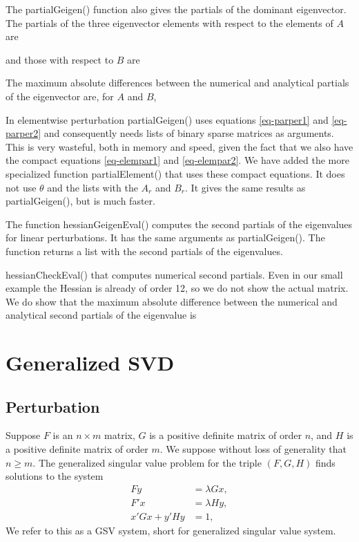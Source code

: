 \documentclass[
  12pt,
  letterpaper,
  DIV=11,
  numbers=noendperiod]{scrartcl}
\newcommand{\sectionbreak}{\clearpage}
\begin{document}
The partialGeigen() function also gives the partials of the dominant
eigenvector. The partials of the three eigenvector elements with respect
to the elements of \(A\) are

and those with respect to \(B\) are

The maximum absolute differences between the numerical and analytical
partials of the eigenvector are, for \(A\) and \(B\),

In elementwise perturbation partialGeigen() uses equations
\eqref{eq-parper1} and \eqref{eq-parper2} and consequently needs lists
of binary sparse matrices as arguments. This is very wasteful, both in
memory and speed, given the fact that we also have the compact equations
\eqref{eq-elempar1} and \eqref{eq-elempar2}. We have added the more
specialized function partialElement() that uses these compact equations.
It does not use \(\theta\) and the lists with the \(A_r\) and \(B_r\).
It gives the same results as partialGeigen(), but is much faster.

The function hessianGeigenEval() computes the second partials of the
eigenvalues for linear perturbations. It has the same arguments as
partialGeigen(). The function returns a list with the second partials of
the eigenvalues.

hessianCheckEval() that computes numerical second partials. Even in our
small example the Hessian is already of order 12, so we do not show the
actual matrix. We do show that the maximum absolute difference between
the numerical and analytical second partials of the eigenvalue is

\sectionbreak

\section{Generalized SVD}\label{sec-GSV}

\subsection{Perturbation}\label{perturbation}

Suppose \(F\) is an \(n\times m\) matrix, \(G\) is a positive definite
matrix of order \(n\), and \(H\) is a positive definite matrix of order
\(m\). We suppose without loss of generality that \(n\geq m\). The
generalized singular value problem for the triple \((F,G,H)\) finds
solutions to the system \begin{subequations}
\begin{align}
Fy&=\lambda Gx,\label{eq-svd1}\\
F'x&=\lambda Hy,\label{eq-svd2}\\
x'Gx+y'Hy&=1,\label{eq-svd3}
\end{align}
\end{subequations} We refer to this as a GSV system, short for
generalized singular value system.
\end{document}
